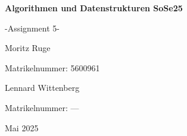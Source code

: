 \begin{titlepage}
    \centering
    \vspace*{3cm}
    {\Huge\bfseries Algorithmen und Datenstrukturen SoSe25 \par}
    \vspace{0.5cm}
    {\Huge -Assignment 5- \par}
    \vspace{1cm}
    {\Large Moritz Ruge \par}
    \vspace{0.1cm}
    {\small Matrikelnummer: 5600961 \par}
    {\Large Lennard Wittenberg \par}
    \vspace{0.1cm}
    {\small Matrikelnummer: ---\par}
    \vfill
    {\large Mai 2025}
\end{titlepage}